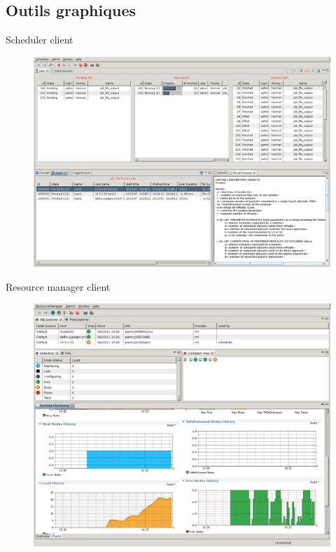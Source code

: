\documentclass{beamer}
\begin{document}
\subsection{Outils graphiques}
\begin{frame}
	\tableofcontents[currentsubsection]
\end{frame}
\begin{frame}{Scheduler client}
    \begin{figure}
        \centering
        \includegraphics[scale=0.18]{sc_sched.png}
    \end{figure}
\end{frame}
\begin{frame}{Resource manager client}
    \begin{figure}
        \centering
        \includegraphics[scale=0.18]{sc_rmc.png}
    \end{figure}
\end{frame}
\end{document}
